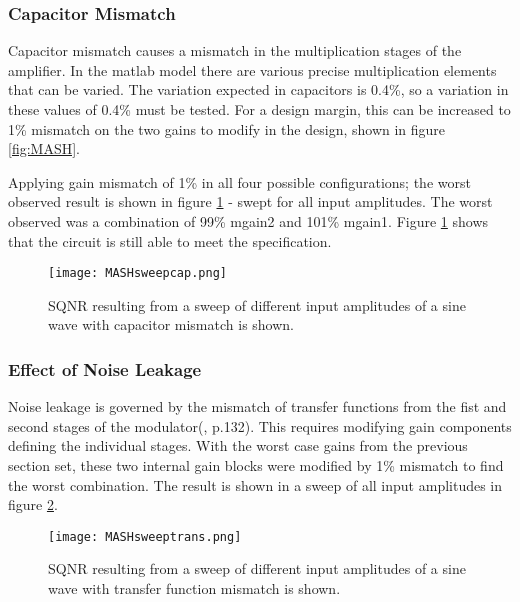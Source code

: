         \subsubsection{Capacitor Mismatch}
        Capacitor mismatch causes a mismatch in the multiplication stages of the amplifier.
        In the matlab model there are various precise multiplication elements that can be varied.
        The variation expected in capacitors is 0.4\%, so a variation in these values of 0.4\% must be tested.
        For a design margin, this can be increased to 1\% mismatch on the two gains to modify in the design, shown in figure \ref{fig:MASH}.

        Applying gain mismatch of 1\% in all four possible configurations; the worst observed result is shown in figure \ref{fig:SQNRcap} - swept for all input amplitudes.
        The worst observed was a combination of 99\% mgain2 and 101\% mgain1.
        Figure \ref{fig:SQNRcap} shows that the circuit is still able to meet the specification.
 
        \begin{figure}
            \begin{center}
            \texttt{[image: MASHsweepcap.png]}
            \caption{SQNR resulting from a sweep of different input amplitudes of a sine wave with capacitor mismatch is shown.}
            \label{fig:SQNRcap}
            \end{center}
        \end{figure} 

        \subsubsection{Effect of Noise Leakage} 
        \label{Verification:leakage}
        Noise leakage is governed by the mismatch of transfer functions from the fist and second stages of the modulator(\cite{Schreier2004}, p.132).
        This requires modifying gain components defining the individual stages.
        With the worst case gains from the previous section set, these two internal gain blocks were modified by 1\% mismatch to find the worst combination.
        The result is shown in a sweep of all input amplitudes in figure \ref{fig:SQNRtrans}.

        \begin{figure}
            \begin{center}
            \texttt{[image: MASHsweeptrans.png]}
            \caption{SQNR resulting from a sweep of different input amplitudes of a sine wave with transfer function mismatch is shown.}
            \label{fig:SQNRtrans}
            \end{center}
        \end{figure} 

